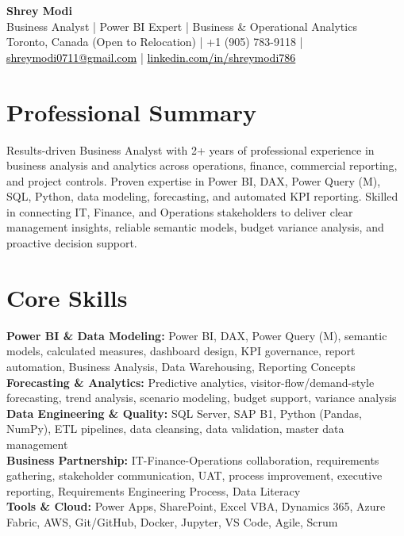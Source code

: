 \documentclass[10.5pt,letterpaper]{article}
\begin{document}
\begin{center}
  {\Huge \bfseries \color{accent} Shrey Modi}\\[0.3em]
  {\normalsize Business Analyst | Power BI Expert | Business \& Operational Analytics}\\[0.1em]
  {\small
    Toronto, Canada (Open to Relocation)
 | +1 (905) 783-9118 | \href{mailto:shreymodi0711@gmail.com}{\textcolor{black}{shreymodi0711@gmail.com}} | \href{https://linkedin.com/in/shreymodi786}{\textcolor{black}{linkedin.com/in/shreymodi786}}  }
\end{center}
\vspace{-12pt}

\section{Professional Summary}
\noindent Results-driven Business Analyst with 2+ years of professional experience in business analysis and analytics across operations, finance, commercial reporting, and project controls. Proven expertise in Power BI, DAX, Power Query (M), SQL, Python, data modeling, forecasting, and automated KPI reporting. Skilled in connecting IT, Finance, and Operations stakeholders to deliver clear management insights, reliable semantic models, budget variance analysis, and proactive decision support.

\section{Core Skills}
\noindent
\textbf{Power BI \& Data Modeling:} Power BI, DAX, Power Query (M), semantic models, calculated measures, dashboard design, KPI governance, report automation, Business Analysis, Data Warehousing, Reporting Concepts\\\textbf{Forecasting \& Analytics:} Predictive analytics, visitor-flow/demand-style forecasting, trend analysis, scenario modeling, budget support, variance analysis\\\textbf{Data Engineering \& Quality:} SQL Server, SAP B1, Python (Pandas, NumPy), ETL pipelines, data cleansing, data validation, master data management\\\textbf{Business Partnership:} IT-Finance-Operations collaboration, requirements gathering, stakeholder communication, UAT, process improvement, executive reporting, Requirements Engineering Process, Data Literacy\\\textbf{Tools \& Cloud:} Power Apps, SharePoint, Excel VBA, Dynamics 365, Azure Fabric, AWS, Git/GitHub, Docker, Jupyter, VS Code, Agile, Scrum
\end{document}
